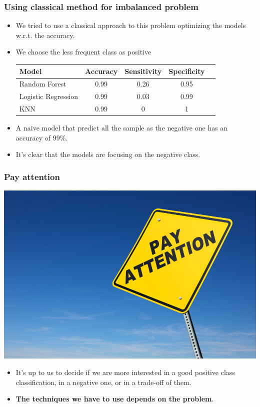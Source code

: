\documentclass[9pt]{beamer}
\begin{document}
\begin{frame}
\frametitle{Using classical method for imbalanced problem}
\begin{itemize}

\item<1 -> We tried to use a classical approach to this problem optimizing the models w.r.t. the accuracy.
\item<2 -> We choose the less frequent class as positive
\begin{table}
\begin{tabular}{l | c | c | c | c }
Model & Accuracy & Sensitivity & Specificity  \\
\hline \hline
Random Forest  & 0.99 & 0.26 & 0.95 \\ 
Logistic Regression & 0.99 & 0.03 & 0.99\\
KNN & 0.99 & 0  & 1\\
\end{tabular}
\end{table}
\item<3 -> A naive model that predict all the sample as the negative one has an accuracy of $99\%$.
\item<4 -> It's clear that the models are focusing on the negative class.
\end{itemize}
\end{frame}

\begin{frame}
\frametitle{Pay attention}
\begin{center}
\includegraphics[scale=0.8]{images/payattention.jpeg}
\end{center}
\vspace{3mm}

\begin{itemize}
\item<1-> It's up to us to decide if we are more interested in a good positive class classification, in a negative one, or in a trade-off of them. 
\item<2-> \textbf{The techniques we have to use depends on the problem}.


\end{itemize}
\end{frame}
\end{document}
